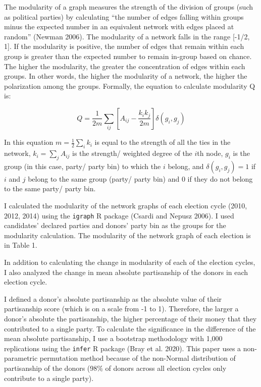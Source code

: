 \documentclass[12pt,]{article}
\begin{document}
The modularity of a graph measures the strength of the division of
groups (such as political parties) by calculating ``the number of edges
falling within groups minus the expected number in an equivalent network
with edges placed at random'' (Newman 2006). The modularity of a network
falls in the range {[}-1/2, 1{]}. If the modularity is positive, the
number of edges that remain within each group is greater than the
expected number to remain in-group based on chance. The higher the
modularity, the greater the concentration of edges within each groups.
In other words, the higher the modularity of a network, the higher the
polarization among the groups. Formally, the equation to calculate
modularity Q is:

\[Q = \frac{1}{2m} \sum_{ij}\left[A_{ij} - \frac{k_{i}k_{j}}{2m} \right]\delta(g_{i},g_{j})\]

In this equation \(m = \frac{1}{2}\sum_{i}k_{i}\) is equal to the
strength of all the ties in the network, \(k_{i}=\sum_{j}A_{ij}\) is the
strength/ weighted degree of the \(i\)th node, \(g_{i}\) is the group
(in this case, party/ party bin) to which the \(i\) belong, and
\(\delta(g_{i},g_{j}) = 1\) if \(i\) and \(j\) belong to the same group
(party/ party bin) and 0 if they do not belong to the same party/ party
bin.

I calculated the modularity of the network graphs of each election cycle
(2010, 2012, 2014) using the \texttt{igraph} R package (Csardi and
Nepusz 2006). I used candidates' declared parties and donors' party bin
as the groups for the modularity calculation. The modularity of the
network graph of each election is in Table 1.

In addition to calculating the change in modularity of each of the
election cycles, I also analyzed the change in mean absolute
partisanship of the donors in each election cycle.

I defined a donor's absolute partisanship as the absolute value of their
partisanship score (which is on a scale from -1 to 1). Therefore, the
larger a donor's absolute the partisanship, the higher percentage of
their money that they contributed to a single party. To calculate the
significance in the difference of the mean absolute partisanship, I use
a bootstrap methodology with 1,000 replications using the \texttt{infer}
R package (Bray et al. 2020). This paper uses a non-parametric
permutation method because of the non-Normal distribution of
partisanship of the donors (98\% of donors across all election cycles
only contribute to a single party).
\end{document}
